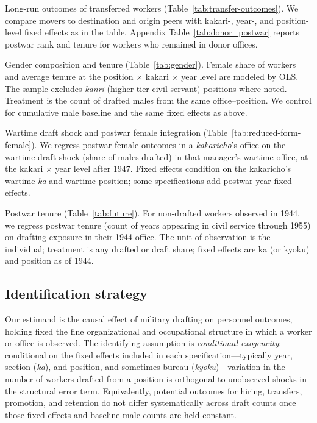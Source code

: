 Long-run outcomes of transferred workers (Table~\ref{tab:transfer-outcomes}). We compare movers to destination and origin peers with kakari-, year-, and position-level fixed effects as in the table. Appendix Table~\ref{tab:donor_postwar} reports postwar rank and tenure for workers who remained in donor offices.

Gender composition and tenure (Table~\ref{tab:gender}). Female share of workers and average tenure at the position $\times$ kakari $\times$ year level are modeled by OLS. The sample excludes \emph{kanri} (higher-tier civil servant) positions where noted. Treatment is the count of drafted males from the same office--position. We control for cumulative male baseline and the same fixed effects as above.

Wartime draft shock and postwar female integration (Table~\ref{tab:reduced-form-female}). We regress postwar female outcomes in a \emph{kakaricho}'s office on the wartime draft shock (share of males drafted) in that manager's wartime office, at the kakari $\times$ year level after 1947. Fixed effects condition on the kakaricho's wartime \emph{ka} and wartime position; some specifications add postwar year fixed effects.

Postwar tenure (Table~\ref{tab:future}). For non-drafted workers observed in 1944, we regress postwar tenure (count of years appearing in civil service through 1955) on drafting exposure in their 1944 office. The unit of observation is the individual; treatment is any drafted or draft share; fixed effects are ka (or kyoku) and position as of 1944.

\subsection{Identification strategy}
\label{sec:identification}

Our estimand is the causal effect of military drafting on personnel outcomes, holding fixed the fine organizational and occupational structure in which a worker or office is observed. The identifying assumption is \emph{conditional exogeneity}: conditional on the fixed effects included in each specification---typically year, section (\emph{ka}), and position, and sometimes bureau (\emph{kyoku})---variation in the number of workers drafted from a position is orthogonal to unobserved shocks in the structural error term. Equivalently, potential outcomes for hiring, transfers, promotion, and retention do not differ systematically across draft counts once those fixed effects and baseline male counts are held constant.

